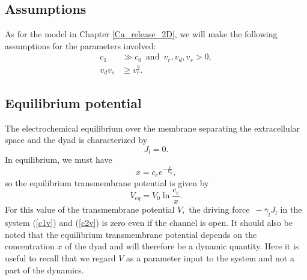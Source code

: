 \subsection{Assumptions}

As for the model in Chapter  \ref{Ca_release_2D}, we will make the following assumptions for the parameters involved:
\begin{align}
 c_{1}&\gg c_{0} \, \mbox{ and } \, v_r,v_d,v_s >0,  \label{assumption1V} \\
 v_{d}v_{s}&\ge v_{r}^{2}.  \label{assumption2V}
\end{align}

\begin{comment}
In the present model the transmembrane potential is a parameter and we will assume that it satisfies the condition
\begin{equation}
V\leqslant V_{0}\ln\left(  \frac{v_{r}+v_{d}}{c_{1}v_{r}+c_{0}v_{d}}
c_{e}\right). \label{cond_V_200}
\end{equation}
With the parameters used in our computations (see Table \ref{tab:param2DV}),  this condition implies
that we consider transmembrane potentials satisfying the condition
\begin{equation}
V\leqslant39.87\text{mV.}\label{cond_V_201}
\end{equation}
\end{comment}


\subsection{Equilibrium potential}

\bigskip The electrochemical equilibrium over the membrane separating the
extracellular space and the dyad is characterized by
\[
J_{l}=0.
\]
In equilibrium, we must have
\[
x=c_{e}e^{-\frac{V}{V_0}},
\]
so the equilibrium transmembrane potential is given by
\begin{equation}
V_{eq}=V_0 \ln\frac{c_{e}}{x}\label{V_eq}.
\end{equation}
For this value of the transmembrane potential $V,$ the driving force $\, -\bar{\gamma}_{l}J_{l}$ in the
system (\ref{c1v}) and (\ref{c2v}) is zero even if the channel is open. It
should also be noted that the equilibrium transmembrane potential depends on
the concentration $x$ of the dyad and will therefore be a dynamic quantity. Here it is useful to
recall that we regard $V$ as a parameter input to the system and not a part of the dynamics.

\bigskip

